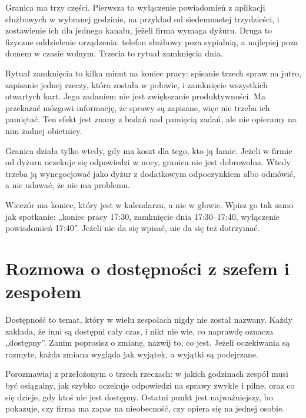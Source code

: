 Granica ma trzy części. Pierwsza to wyłączenie powiadomień z aplikacji służbowych w wybranej godzinie, na przykład od siedemnastej trzydzieści, i zostawienie ich dla jednego kanału, jeżeli firma wymaga dyżuru. Druga to fizyczne oddzielenie urządzenia: telefon służbowy poza sypialnią, a najlepiej poza domem w czasie wolnym. Trzecia to rytuał zamknięcia dnia.

Rytuał zamknięcia to kilka minut na koniec pracy: spisanie trzech spraw na jutro, zapisanie jednej rzeczy, która została w połowie, i zamknięcie wszystkich otwartych kart. Jego zadaniem nie jest zwiększanie produktywności. Ma przekazać mózgowi informację, że sprawy są zapisane, więc nie trzeba ich pamiętać. Ten efekt jest znany z badań nad pamięcią zadań, ale nie opieramy na nim żadnej obietnicy.

Granica działa tylko wtedy, gdy ma koszt dla tego, kto ją łamie. Jeżeli w firmie od dyżuru oczekuje się odpowiedzi w nocy, granica nie jest dobrowolna. Wtedy trzeba ją wynegocjować jako dyżur z dodatkowym odpoczynkiem albo odmówić, a nie udawać, że nie ma problemu.

\begin{zasada}
Wieczór ma koniec, który jest w kalendarzu, a nie w głowie. Wpisz go tak samo jak spotkanie: „koniec pracy 17:30, zamknięcie dnia 17:30–17:40, wyłączenie powiadomień 17:40”. Jeżeli nie da się wpisać, nie da się też dotrzymać.
\end{zasada}

\section{Rozmowa o dostępności z szefem i zespołem}

Dostępność to temat, który w wielu zespołach nigdy nie został nazwany. Każdy zakłada, że inni są dostępni cały czas, i nikt nie wie, co naprawdę oznacza „dostępny”. Zanim poprosisz o zmianę, nazwij to, co jest. Jeżeli oczekiwania są rozmyte, każda zmiana wygląda jak wyjątek, a wyjątki są podejrzane.

Porozmawiaj z przełożonym o trzech rzeczach: w jakich godzinach zespół musi być osiągalny, jak szybko oczekuje odpowiedzi na sprawy zwykłe i pilne, oraz co się dzieje, gdy ktoś nie jest dostępny. Ostatni punkt jest najważniejszy, bo pokazuje, czy firma ma zapas na nieobecność, czy opiera się na jednej osobie.

